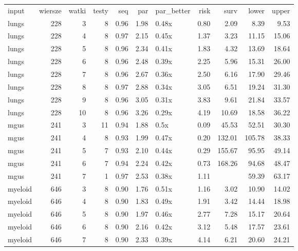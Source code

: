 \begin{table}[ht]
\centering
\begin{tabular}{lrrrrrlrrrr}
 input & wiersze & watki & testy & seq & par & par\_better & risk & surv & lower & upper \\ 
 lungs & 228 &   3 &   8 & 0.96 & 1.98 & 0.48x & 0.80 & 2.09 & 8.39 & 9.53 \\ 
   \hline
lungs & 228 &   4 &   8 & 0.97 & 2.15 & 0.45x & 1.37 & 3.23 & 11.15 & 15.06 \\ 
   \hline
lungs & 228 &   5 &   8 & 0.96 & 2.34 & 0.41x & 1.83 & 4.32 & 13.69 & 18.64 \\ 
   \hline
lungs & 228 &   6 &   8 & 0.96 & 2.48 & 0.39x & 2.25 & 5.96 & 15.31 & 26.00 \\ 
   \hline
lungs & 228 &   7 &   8 & 0.96 & 2.67 & 0.36x & 2.50 & 6.16 & 17.90 & 29.46 \\ 
   \hline
lungs & 228 &   8 &   8 & 0.97 & 2.88 & 0.34x & 3.05 & 6.51 & 19.24 & 31.30 \\ 
   \hline
lungs & 228 &   9 &   8 & 0.96 & 3.05 & 0.31x & 3.83 & 9.61 & 21.84 & 33.57 \\ 
   \hline
lungs & 228 &  10 &   8 & 0.96 & 3.26 & 0.29x & 4.19 & 10.69 & 18.58 & 36.22 \\ 
   \hline
mgus & 241 &   3 &  11 & 0.94 & 1.88 & 0.5x & 0.09 & 45.53 & 52.51 & 30.30 \\ 
   \hline
mgus & 241 &   4 &   8 & 0.93 & 1.99 & 0.47x & 0.20 & 132.01 & 105.78 & 38.33 \\ 
   \hline
mgus & 241 &   5 &   7 & 0.93 & 2.10 & 0.44x & 0.29 & 155.67 & 95.95 & 49.14 \\ 
   \hline
mgus & 241 &   6 &   7 & 0.94 & 2.24 & 0.42x & 0.73 & 168.26 & 94.68 & 48.47 \\ 
   \hline
mgus & 241 &   7 &   1 & 0.97 & 2.53 & 0.38x & 1.11 &  & 59.39 & 63.17 \\ 
   \hline
myeloid & 646 &   3 &   8 & 0.90 & 1.76 & 0.51x & 1.16 & 3.02 & 10.90 & 14.02 \\ 
   \hline
myeloid & 646 &   4 &   8 & 0.90 & 1.83 & 0.49x & 1.91 & 3.42 & 14.44 & 18.98 \\ 
   \hline
myeloid & 646 &   5 &   8 & 0.90 & 1.97 & 0.46x & 2.77 & 7.28 & 15.17 & 20.64 \\ 
   \hline
myeloid & 646 &   6 &   8 & 0.90 & 2.16 & 0.42x & 3.12 & 5.48 & 17.57 & 23.61 \\ 
   \hline
myeloid & 646 &   7 &   8 & 0.90 & 2.33 & 0.39x & 4.14 & 6.21 & 20.60 & 24.21 \\ 

\end{tabular}
\end{table}
